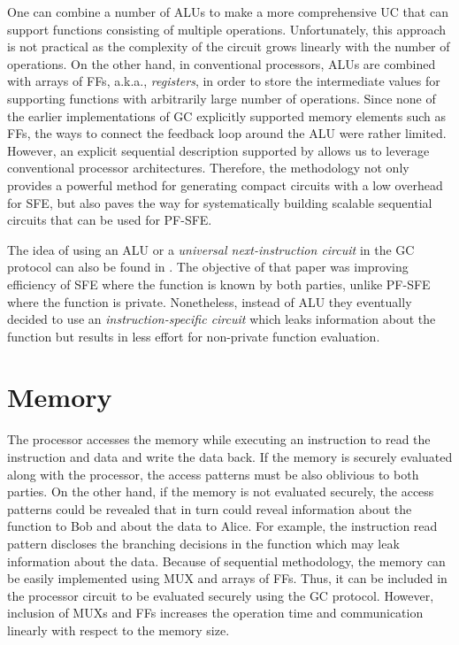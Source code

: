 One can combine a number of ALUs to make a more comprehensive UC that can support functions consisting of multiple operations.
Unfortunately, this approach is not practical as the complexity of the circuit grows linearly with the number of operations.
On the other hand, in conventional processors, ALUs are combined with arrays of FFs, a.k.a., \emph{registers}, in order to store the intermediate values for supporting functions with arbitrarily large number of operations.
Since none of the earlier implementations of GC explicitly supported memory elements such as FFs, the ways to connect the feedback loop around the ALU were rather limited.
However, an explicit sequential description supported by \sys{} allows us to leverage conventional processor architectures.
Therefore, the \sys{} methodology not only provides a powerful method for generating compact circuits with a low overhead for SFE, but also paves the way for systematically building scalable sequential circuits that can be used for PF-SFE.

The idea of using an ALU or a \emph{universal next-instruction circuit} in the GC protocol can also be found in \cite{liu2014automating}.
The objective of that paper was improving efficiency of SFE where the function is known by both parties, unlike PF-SFE where the function is private.
Nonetheless, instead of ALU they eventually decided to use an \emph{instruction-specific circuit} which leaks information about the function but results in less effort for non-private function evaluation.

\section{Memory}
The processor accesses the memory while executing an instruction to read the instruction and data and write the data back.
If the memory is securely evaluated along with the processor, the access patterns must be also oblivious to both parties.
On the other hand, if the memory is not evaluated securely, the access patterns could be revealed that in turn could reveal information about the function to Bob and about the data to Alice.
For example, the instruction read pattern discloses the branching decisions in the function which may leak information about the data.
Because of \sys{} sequential methodology, the memory can be easily implemented using MUX and arrays of FFs.
Thus, it can be included in the processor circuit to be evaluated securely using the GC protocol.
However, inclusion of MUXs and FFs increases the operation time and communication linearly with respect to the memory size.


